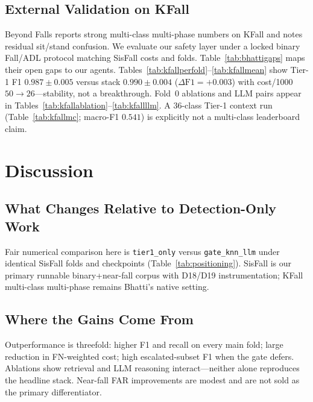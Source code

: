 \documentclass[journal]{IEEEtran}
\begin{document}


\subsection{External Validation on KFall}
\label{sec:kfall}
Beyond Falls reports strong multi-class multi-phase numbers on KFall and notes residual sit/stand confusion. We evaluate our safety layer under a locked binary Fall/ADL protocol matching SisFall costs and folds. Table~\ref{tab:bhattigaps} maps their open gaps to our agents. Tables~\ref{tab:kfallperfold}--\ref{tab:kfallmean} show Tier-1 F1 $0.987{\pm}0.005$ versus stack $0.990{\pm}0.004$ ($\Delta\text{F1}{=}+0.003$) with cost/1000 $50{\rightarrow}26$---stability, not a breakthrough. Fold~0 ablations and LLM pairs appear in Tables~\ref{tab:kfallablation}--\ref{tab:kfallllm}. A 36-class Tier-1 context run (Table~\ref{tab:kfallmc}; macro-F1 $0.541$) is explicitly not a multi-class leaderboard claim.








\section{Discussion}
\label{sec:discussion}

\subsection{What Changes Relative to Detection-Only Work}
Fair numerical comparison here is \texttt{tier1\_only} versus \texttt{gate\_knn\_llm} under identical SisFall folds and checkpoints (Table~\ref{tab:positioning}). SisFall is our primary runnable binary+near-fall corpus with D18/D19 instrumentation; KFall multi-class multi-phase remains Bhatti's native setting.

\subsection{Where the Gains Come From}
Outperformance is threefold: higher F1 and recall on every main fold; large reduction in FN-weighted cost; high escalated-subset F1 when the gate defers. Ablations show retrieval and LLM reasoning interact---neither alone reproduces the headline stack. Near-fall FAR improvements are modest and are not sold as the primary differentiator.
\end{document}
